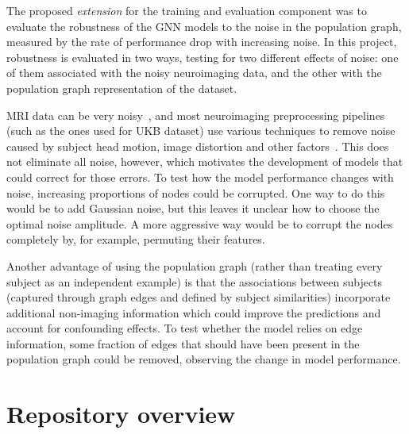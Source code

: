 The proposed \textit{extension} for the training and evaluation component was to evaluate the robustness of the GNN models to the noise in the population graph, measured by the rate of performance drop with increasing noise. In this project, robustness is evaluated in two ways, testing for two different effects of noise: one of them associated with the noisy neuroimaging data, and the other with the population graph representation of the dataset.

MRI data can be very noisy~\cite{pervaiz2020optimising,niu2019improved}, and most neuroimaging preprocessing pipelines (such as the ones used for UKB dataset) use various techniques to remove noise caused by subject head motion, image distortion and other factors~\cite{glasser2013minimal}. This does not eliminate all noise, however, which motivates the development of models that could correct for those errors. 
To test how the model performance changes with noise, increasing proportions of nodes could be corrupted. One way to do this would be to add Gaussian noise, but this leaves it unclear how to choose the optimal noise amplitude. A more aggressive way would be to corrupt the nodes completely by, for example, permuting their features.

Another advantage of using the population graph (rather than treating every subject as an independent example) is that the associations between subjects (captured through graph edges and defined by subject similarities) incorporate additional non-imaging information which could improve the predictions and account for confounding effects. To test whether the model relies on edge information, some fraction of edges that should have been present in the population graph could be removed, observing the change in model performance. 


\section{Repository overview}

